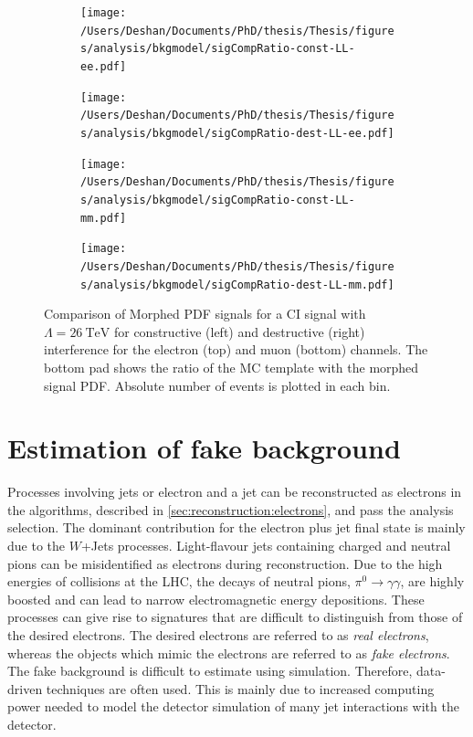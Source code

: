 \begin{figure}[h!]
    \centering
    \begin{subfigure}[b]{0.49\textwidth}
        \centering
        \texttt{[image: /Users/Deshan/Documents/PhD/thesis/Thesis/figures/analysis/bkgmodel/sigCompRatio-const-LL-ee.pdf]}
        \label{fig:bkgmodel:ratioMorphee1}
    \end{subfigure}
    \begin{subfigure}[b]{0.49\textwidth}
        \centering
        \texttt{[image: /Users/Deshan/Documents/PhD/thesis/Thesis/figures/analysis/bkgmodel/sigCompRatio-dest-LL-ee.pdf]}
        \label{fig:bkgmodel:ratioMorphee2}
    \end{subfigure}
    \begin{subfigure}[b]{0.49\textwidth}
        \centering
        \texttt{[image: /Users/Deshan/Documents/PhD/thesis/Thesis/figures/analysis/bkgmodel/sigCompRatio-const-LL-mm.pdf]}
        \label{fig:bkgmodel:ratioMorphmm1}
    \end{subfigure}
    \begin{subfigure}[b]{0.49\textwidth}
        \centering
        \texttt{[image: /Users/Deshan/Documents/PhD/thesis/Thesis/figures/analysis/bkgmodel/sigCompRatio-dest-LL-mm.pdf]}
        \label{fig:bkgmodel:ratioMorphmm2}
    \end{subfigure}
    \caption[Comparison of morphed signal PDF with generated signal template]{Comparison of Morphed PDF signals for a CI signal with $\Lambda = \SI{26}{\tera\electronvolt}$ for constructive (left) and destructive (right) interference for the electron (top) and muon (bottom) channels. The bottom pad shows the ratio of the MC template with the morphed signal PDF. Absolute number of events is plotted in each bin.}
    \label{fig:bkgmodel:ratioMorph}
\end{figure}

\section{Estimation of fake background}\label{sec:datamc:fakes}
Processes involving jets or electron and a jet can be reconstructed as electrons in the algorithms, described in \cref{sec:reconstruction:electrons}, and pass the analysis selection. The dominant contribution for the electron plus jet final state is mainly due to the $W$+Jets processes. Light-flavour jets containing charged and neutral pions can be misidentified as electrons during reconstruction. Due to the high energies of collisions at the LHC, the decays of neutral pions, $\pi^0 \rightarrow \gamma\gamma$, are highly boosted and can lead to narrow electromagnetic energy depositions. These processes can give rise to signatures that are difficult to distinguish from those of the desired electrons. The desired electrons are referred to as \emph{real electrons}, whereas the objects which mimic the electrons are referred to as \emph{fake electrons}. The fake background is difficult to estimate using simulation. Therefore, data-driven techniques are often used. This is mainly due to increased computing power needed to model the detector simulation of many jet interactions with the detector. 


